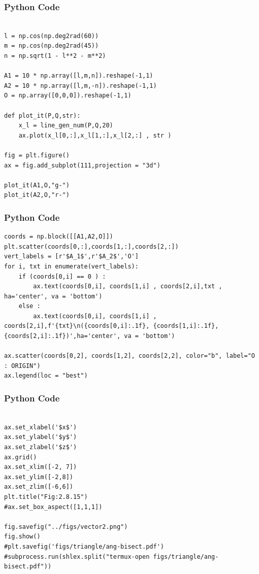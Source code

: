 \documentclass{beamer}
\begin{document}
\begin{frame}[fragile]
    \frametitle{Python Code }
    \begin{lstlisting}

l = np.cos(np.deg2rad(60))
m = np.cos(np.deg2rad(45))
n = np.sqrt(1 - l**2 - m**2)

A1 = 10 * np.array([l,m,n]).reshape(-1,1)
A2 = 10 * np.array([l,m,-n]).reshape(-1,1)
O = np.array([0,0,0]).reshape(-1,1)

def plot_it(P,Q,str):
    x_l = line_gen_num(P,Q,20)
    ax.plot(x_l[0,:],x_l[1,:],x_l[2,:] , str )

fig = plt.figure()
ax = fig.add_subplot(111,projection = "3d")

plot_it(A1,O,"g-")
plot_it(A2,O,"r-")

\end{lstlisting}
\end{frame}

\begin{frame}[fragile]
    \frametitle{Python Code }
    \begin{lstlisting}
coords = np.block([[A1,A2,O]])
plt.scatter(coords[0,:],coords[1,:],coords[2,:])
vert_labels = [r'$A_1$',r'$A_2$','O']
for i, txt in enumerate(vert_labels):
    if (coords[0,i] == 0 ) :
        ax.text(coords[0,i], coords[1,i] , coords[2,i],txt , ha='center', va = 'bottom')
    else :
        ax.text(coords[0,i], coords[1,i] , coords[2,i],f'{txt}\n({coords[0,i]:.1f}, {coords[1,i]:.1f}, {coords[2,i]:.1f})',ha='center', va = 'bottom')

ax.scatter(coords[0,2], coords[1,2], coords[2,2], color="b", label="O : ORIGIN")
ax.legend(loc = "best")
\end{lstlisting}
\end{frame}


\begin{frame}[fragile]
    \frametitle{Python Code }
    \begin{lstlisting}

ax.set_xlabel('$x$')
ax.set_ylabel('$y$')
ax.set_zlabel('$z$')
ax.grid()
ax.set_xlim([-2, 7])
ax.set_ylim([-2,8])
ax.set_zlim([-6,6])
plt.title("Fig:2.8.15")
#ax.set_box_aspect([1,1,1])

fig.savefig("../figs/vector2.png")
fig.show()
#plt.savefig('figs/triangle/ang-bisect.pdf')
#subprocess.run(shlex.split("termux-open figs/triangle/ang-bisect.pdf"))

    \end{lstlisting}
\end{frame}
\end{document}
